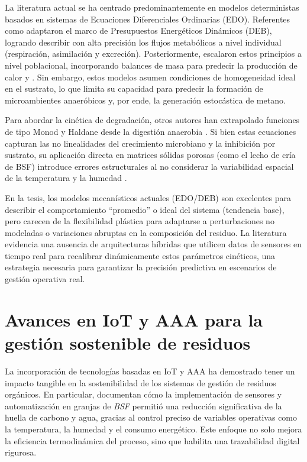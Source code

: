 La literatura actual se ha centrado predominantemente en modelos deterministas basados en sistemas de Ecuaciones Diferenciales Ordinarias (EDO). Referentes como \textcite{padmanabhaComprehensiveDynamicGrowth2020} adaptaron el marco de Presupuestos Energéticos Dinámicos (DEB), logrando describir con alta precisión los flujos metabólicos a nivel individual (respiración, asimilación y excreción). Posteriormente, \textcite{eriksenDynamicModellingFeed2022} escalaron estos principios a nivel poblacional, incorporando balances de masa para predecir la producción de calor y . Sin embargo, estos modelos asumen condiciones de homogeneidad ideal en el sustrato, lo que limita su capacidad para predecir la formación de microambientes anaeróbicos y, por ende, la generación estocástica de metano.

Para abordar la cinética de degradación, otros autores han extrapolado funciones de tipo Monod y Haldane desde la digestión anaerobia \parencite{winAnaerobicDigestionBlack2018a, ahlamineMathematicalAnalysisAnaerobic2024}. Si bien estas ecuaciones capturan las no linealidades del crecimiento microbiano y la inhibición por sustrato, su aplicación directa en matrices sólidas porosas (como el lecho de cría de BSF) introduce errores estructurales al no considerar la variabilidad espacial de la temperatura y la humedad \parencite{rossiEstimatingDynamicsGreenhouse2024a}.

En la tesis, los modelos mecanísticos actuales (EDO/DEB) son excelentes para describir el comportamiento “promedio” o ideal del sistema (tendencia base), pero carecen de la flexibilidad plástica para adaptarse a perturbaciones no modeladas o variaciones abruptas en la composición del residuo. La literatura evidencia una ausencia de arquitecturas híbridas que utilicen datos de sensores en tiempo real para recalibrar dinámicamente estos parámetros cinéticos, una estrategia necesaria para garantizar la precisión predictiva en escenarios de gestión operativa real.

\section{Avances en IoT y AAA para la gestión sostenible de residuos}

La incorporación de tecnologías basadas en IoT y AAA ha demostrado tener un impacto tangible en la sostenibilidad de los sistemas de gestión de residuos orgánicos. En particular, \textcite{galan-diazCarbonWaterFootprint2024a} documentan cómo la implementación de sensores y automatización en granjas de \textit{BSF} permitió una reducción significativa de la huella de carbono y agua, gracias al control preciso de variables operativas como la temperatura, la humedad y el consumo energético. Este enfoque no solo mejora la eficiencia termodinámica del proceso, sino que habilita una trazabilidad digital rigurosa.

